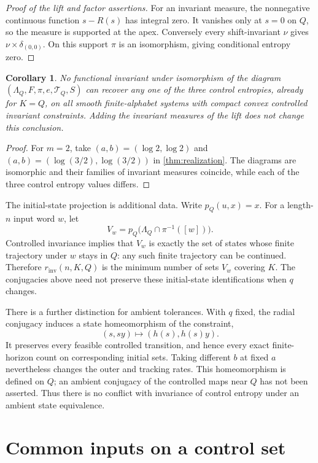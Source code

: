 \documentclass[11pt,a4paper]{article}
\newtheorem{corollary}[theorem]{Corollary}
\theoremstyle{remark}
\newcommand{\T}{\mathcal T}
\newcommand{\rinv}{r_{\mathrm{inv}}}
\begin{document}
\begin{proof}[Proof of the lift and factor assertions]
For an invariant measure, the nonnegative continuous function
$s-R(s)$ has integral zero. It vanishes only at $s=0$ on $Q$, so the
measure is supported at the apex. Conversely every shift-invariant
$\nu$ gives $\nu\times\delta_{(0,0)}$.
On this support $\pi$ is an isomorphism, giving conditional entropy zero.
\end{proof}

\begin{corollary}\label{cor:no-go}
No functional invariant under isomorphism of the diagram
$(\Lambda_Q,F,\pi,e,\T_Q,S)$ can recover any one of the three control
entropies, already for $K=Q$, on all smooth finite-alphabet systems with compact convex
controlled invariant constraints. Adding the invariant measures of the
lift does not change this conclusion.
\end{corollary}
\begin{proof}
For $m=2$, take $(a,b)=(\log2,\log2)$ and
$(a,b)=(\log(3/2),\log(3/2))$ in \cref{thm:realization}.
The diagrams are isomorphic and their families of invariant measures
coincide, while each of the three control entropy values differs.
\end{proof}

The initial-state projection is additional data. Write
$p_Q(u,x)=x$. For a length-$n$ input word $w$, let
\[
 V_w=p_Q\bigl(\Lambda_Q\cap\pi^{-1}([w])\bigr).
\]
Controlled invariance implies that $V_w$ is exactly the set of states
whose finite trajectory under $w$ stays in $Q$: any such finite trajectory
can be continued. Therefore $\rinv(n,K,Q)$ is the minimum number of sets
$V_w$ covering $K$. The conjugacies above need not preserve these
initial-state identifications when $q$ changes.

There is a further distinction for ambient tolerances. With $q$ fixed,
the radial conjugacy induces a state homeomorphism of the constraint,
\[
 (s,sy)\longmapsto(h(s),h(s)y).
\]
It preserves every feasible controlled transition, and hence every exact
finite-horizon count on corresponding initial sets. Taking different
$b$ at fixed $a$ nevertheless changes the outer and tracking rates.
This homeomorphism is defined on $Q$; an ambient conjugacy of the
controlled maps near $Q$ has not been asserted. Thus there is no conflict
with invariance of control entropy under an ambient state equivalence.

\section{Common inputs on a control set}
\end{document}
